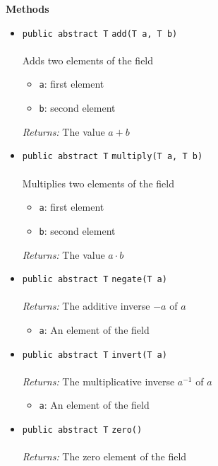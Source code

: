 \textbf{\sffamily Methods}
\begin{itemize}
\item \lstinline|public abstract T| \lstinline|add|\lstinline|(T a, T b)|\\ \\[-0.6em]
Adds two elements of the field
\begin{itemize}
\item \lstinline|a|: first element
\item \lstinline|b|: second element
\end{itemize}

\emph{Returns:} The value $a + b$

\item \lstinline|public abstract T| \lstinline|multiply|\lstinline|(T a, T b)|\\ \\[-0.6em]
Multiplies two elements of the field
\begin{itemize}
\item \lstinline|a|: first element
\item \lstinline|b|: second element
\end{itemize}

\emph{Returns:} The value $a \cdot b$

\item \lstinline|public abstract T| \lstinline|negate|\lstinline|(T a)|\\ \\[-0.6em]
\emph{Returns:} The additive inverse $-a$ of $a$
\begin{itemize}
\item \lstinline|a|: An element of the field
\end{itemize}



\item \lstinline|public abstract T| \lstinline|invert|\lstinline|(T a)|\\ \\[-0.6em]
\emph{Returns:} The multiplicative inverse $a^{-1}$ of $a$
\begin{itemize}
\item \lstinline|a|: An element of the field
\end{itemize}



\item \lstinline|public abstract T| \lstinline|zero|\lstinline|()|\\ \\[-0.6em]
\emph{Returns:} The zero element of the field




\end{itemize}
